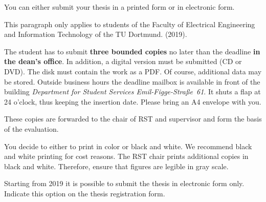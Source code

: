 You can either submit your thesis in a printed form or in electronic form.


This paragraph only applies to students of the Faculty of Electrical Engineering and Information Technology of the TU Dortmund. (2019).

The student has to submit \textbf{three bounded copies} no later than the deadline \textbf{in the dean's office}. In addition, a digital version must be submitted (CD or DVD).
The disk must contain the work as a PDF.
Of course, additional data may be stored.
Outside business hours the deadline mailbox is available in front of the building \textit{Department for Student Services Emil-Figge-Straße~61}.
It shuts a flap at 24 o'clock, thus keeping the insertion date. Please bring an A4 envelope with you.

These copies are forwarded to the chair of RST and supervisor and form the basis of the evaluation.

You decide to either to print in color or black and white.
We recommend black and white printing for cost reasons.
The RST chair prints additional copies in black and white. Therefore, ensure that  figures are legible in gray scale.

Starting from 2019 it is possible to submit the thesis in electronic form only.
Indicate this option on the thesis registration form.
